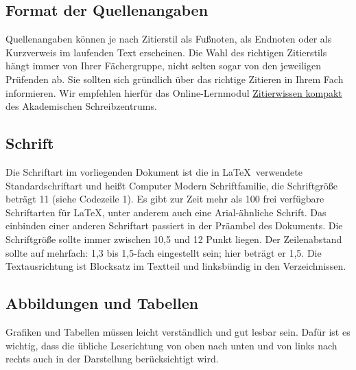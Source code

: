 \documentclass[a4paper,11pt]{article}%
\renewcommand{\\}{\vspace*{0.5\baselineskip} \newline}
\begin{document}
\subsection{Format der Quellenangaben}
Quellenangaben können je nach Zitierstil als Fußnoten, als Endnoten oder als Kurzverweis im laufenden Text erscheinen. Die Wahl des richtigen Zitierstils hängt immer von Ihrer Fächergruppe, nicht selten sogar von den jeweiligen Prüfenden ab. Sie sollten sich gründlich über das richtige Zitieren in Ihrem Fach informieren. Wir empfehlen hierfür das Online-Lernmodul \href{https://ilias.th-koeln.de/ilias.php?baseClass=ilRepositoryGUI}{\underline{Zitierwissen kompakt}} des Akademischen Schreibzentrums.

\subsection{Schrift}
Die Schriftart im vorliegenden Dokument ist die in \LaTeX~verwendete Standardschriftart und heißt Computer Modern Schriftfamilie, die Schriftgröße beträgt 11 (siehe Codezeile 1). Es gibt zur Zeit mehr als 100 frei verfügbare Schriftarten für \LaTeX, unter anderem auch eine Arial-ähnliche Schrift. Das einbinden einer anderen Schriftart passiert in der Präambel des Dokuments. Die Schriftgröße sollte immer zwischen 10,5 und 12 Punkt liegen. \\
Der Zeilenabstand sollte auf mehrfach: 1,3 bis 1,5-fach eingestellt sein; hier beträgt er 1,5. Die Textausrichtung ist Blocksatz im Textteil und linksbündig in den Verzeichnissen.

\subsection{Abbildungen und Tabellen}
Grafiken und Tabellen müssen leicht verständlich und gut lesbar sein. Dafür ist es wichtig, dass die übliche Leserichtung von oben nach unten und von links nach rechts auch in der Darstellung berücksichtigt wird.
\end{document}
